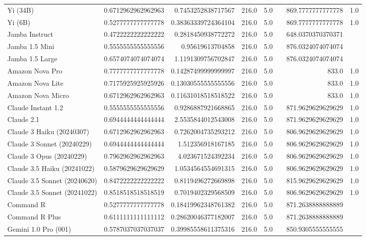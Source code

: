 \begin{table}[htp]
{\begin{tabular}{lrrrrrrr}
Yi (34B) & 0.6712962962962963 & 0.7453252838717567 & 216.0 & 5.0 &  & 869.7777777777778 & 1.0 \\
Yi (6B) & 0.5277777777777778 & 0.38363339724364104 & 216.0 & 5.0 &  & 869.7777777777778 & 1.0 \\
Jamba Instruct & 0.4722222222222222 & 0.2818450938772272 & 216.0 & 5.0 &  & 648.0370370370371 &  \\
Jamba 1.5 Mini & 0.5555555555555556 & 0.95619613704858 & 216.0 & 5.0 &  & 876.0324074074074 &  \\
Jamba 1.5 Large & 0.6574074074074074 & 1.1191309756702847 & 216.0 & 5.0 &  & 876.0324074074074 &  \\
Amazon Nova Pro & 0.7777777777777778 & 0.14287499999999997 & 216.0 & 5.0 &  & 833.0 & 1.0 \\
Amazon Nova Lite & 0.7175925925925926 & 0.13030555555555556 & 216.0 & 5.0 &  & 833.0 & 1.0 \\
Amazon Nova Micro & 0.6712962962962963 & 0.11631018518518522 & 216.0 & 5.0 &  & 833.0 & 1.0 \\
Claude Instant 1.2 & 0.5555555555555556 & 0.9286887921668865 & 216.0 & 5.0 &  & 871.9629629629629 & 1.0 \\
Claude 2.1 & 0.6944444444444444 & 2.5535844012543008 & 216.0 & 5.0 &  & 871.9629629629629 & 1.0 \\
Claude 3 Haiku (20240307) & 0.6712962962962963 & 0.7262004735293212 & 216.0 & 5.0 &  & 806.9629629629629 & 1.0 \\
Claude 3 Sonnet (20240229) & 0.6944444444444444 & 1.512356918167185 & 216.0 & 5.0 &  & 806.9629629629629 & 1.0 \\
Claude 3 Opus (20240229) & 0.7962962962962963 & 4.023671524392234 & 216.0 & 5.0 &  & 806.9629629629629 & 1.0 \\
Claude 3.5 Haiku (20241022) & 0.5879629629629629 & 1.0534564554691315 & 216.0 & 5.0 &  & 806.9629629629629 & 1.0 \\
Claude 3.5 Sonnet (20240620) & 0.8472222222222222 & 0.8119496272669898 & 216.0 & 5.0 &  & 815.9629629629629 & 1.0 \\
Claude 3.5 Sonnet (20241022) & 0.8518518518518519 & 0.7019402329568509 & 216.0 & 5.0 &  & 806.9629629629629 & 1.0 \\
Command R & 0.5277777777777778 & 0.18419962348761382 & 216.0 & 5.0 &  & 871.2638888888889 &  \\
Command R Plus & 0.6111111111111112 & 0.28620046377182007 & 216.0 & 5.0 &  & 871.2638888888889 &  \\
Gemini 1.0 Pro (001) & 0.5787037037037037 & 0.39985558611375316 & 216.0 & 5.0 &  & 850.9305555555555 &  \\

\end{tabular}}
\end{table}
